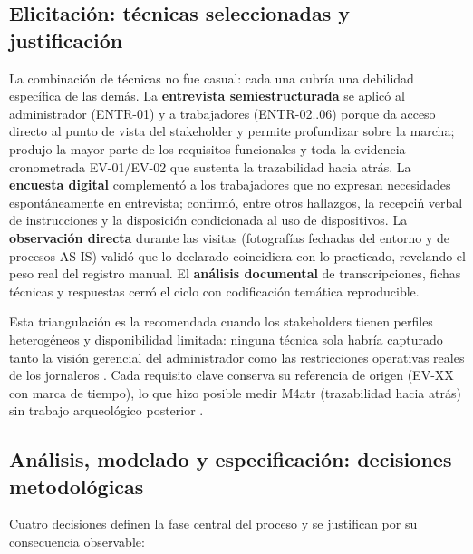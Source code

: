 \subsection{Elicitaci\'on: t\'ecnicas seleccionadas y justificaci\'on}

La combinaci\'on de t\'ecnicas no fue casual: cada una cubr\'ia una debilidad espec\'ifica de las dem\'as. La \textbf{entrevista semiestructurada} se aplic\'o al administrador (ENTR-01) y a trabajadores (ENTR-02..06) porque da acceso directo al punto de vista del stakeholder y permite profundizar sobre la marcha; produjo la mayor parte de los requisitos funcionales y toda la evidencia cronometrada EV-01/EV-02 que sustenta la trazabilidad hacia atr\'as. La \textbf{encuesta digital} complement\'o a los trabajadores que no expresan necesidades espont\'aneamente en entrevista; confirm\'o, entre otros hallazgos, la recepci\'n verbal de instrucciones y la disposici\'on condicionada al uso de dispositivos. La \textbf{observaci\'on directa} durante las visitas (fotograf\'ias fechadas del entorno y de procesos AS-IS) valid\'o que lo declarado coincidiera con lo practicado, revelando el peso real del registro manual. El \textbf{an\'alisis documental} de transcripciones, fichas t\'ecnicas y respuestas cerr\'o el ciclo con codificaci\'on tem\'atica reproducible.

Esta triangulaci\'on es la recomendada cuando los stakeholders tienen perfiles heterog\'eneos y disponibilidad limitada: ninguna t\'ecnica sola habr\'ia capturado tanto la visi\'on gerencial del administrador como las restricciones operativas reales de los jornaleros \cite{swebok2024,pohl2025}. Cada requisito clave conserva su referencia de origen (EV-XX con marca de tiempo), lo que hizo posible medir M4atr (trazabilidad hacia atr\'as) sin trabajo arqueol\'ogico posterior \cite{gotel1994}.

\subsection{An\'alisis, modelado y especificaci\'on: decisiones metodol\'ogicas}

Cuatro decisiones definen la fase central del proceso y se justifican por su consecuencia observable:

